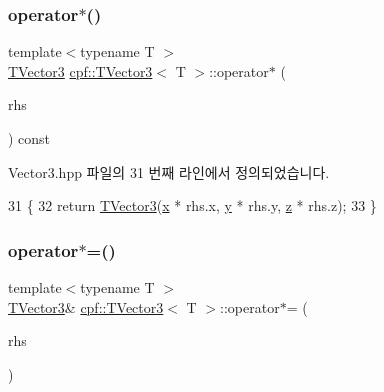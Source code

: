 \subsubsection{\texorpdfstring{operator$\ast$()}{operator*()}}
{\footnotesize\ttfamily template$<$typename T $>$ \\
\hyperlink{classcpf_1_1_t_vector3}{T\+Vector3} \hyperlink{classcpf_1_1_t_vector3}{cpf\+::\+T\+Vector3}$<$ T $>$\+::operator$\ast$ (\begin{DoxyParamCaption}\item[{const \hyperlink{classcpf_1_1_t_vector3}{T\+Vector3}$<$ T $>$ \&}]{rhs }\end{DoxyParamCaption}) const\hspace{0.3cm}{\ttfamily [inline]}}



Vector3.\+hpp 파일의 31 번째 라인에서 정의되었습니다.


\begin{DoxyCode}
31                                                       \{
32             \textcolor{keywordflow}{return} \hyperlink{classcpf_1_1_t_vector3_a31544bebbd3d8737adf44460256b57fd}{TVector3}(\hyperlink{classcpf_1_1_t_vector3_ad3df42808358a64c518d6349ede446d8}{x} * rhs.x, \hyperlink{classcpf_1_1_t_vector3_a2371a0583e76dcc80c6f10dd168cde1b}{y} * rhs.y, \hyperlink{classcpf_1_1_t_vector3_ae7ea5f4b24c3438a44eb6b0fdfe02823}{z} * rhs.z);
33         \}
\end{DoxyCode}
\mbox{\label{classcpf_1_1_t_vector3_a4b76b4847b1fdc99f27bd2d4c13cba05}} 
\subsubsection{\texorpdfstring{operator$\ast$=()}{operator*=()}}
{\footnotesize\ttfamily template$<$typename T $>$ \\
\hyperlink{classcpf_1_1_t_vector3}{T\+Vector3}\& \hyperlink{classcpf_1_1_t_vector3}{cpf\+::\+T\+Vector3}$<$ T $>$\+::operator$\ast$= (\begin{DoxyParamCaption}\item[{const \hyperlink{classcpf_1_1_t_vector3}{T\+Vector3}$<$ T $>$ \&}]{rhs }\end{DoxyParamCaption})\hspace{0.3cm}{\ttfamily [inline]}}



